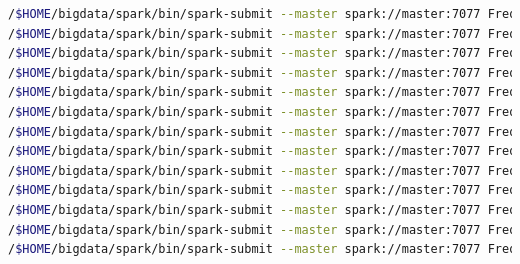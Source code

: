 \begin{lstlisting}[label=sfreqdis,language=sh,frame=single,caption=Script rutas más frecuentes sin estacionalidad en modo distribuido]
/$HOME/bigdata/spark/bin/spark-submit --master spark://master:7077 FrequentRoutes.py mil.parquet 2013-01-01 09:45
/$HOME/bigdata/spark/bin/spark-submit --master spark://master:7077 FrequentRoutes.py quinientos.parquet 2013-01-01 09:45
/$HOME/bigdata/spark/bin/spark-submit --master spark://master:7077 FrequentRoutes.py cinquenta.parquet 2013-01-01 09:45
/$HOME/bigdata/spark/bin/spark-submit --master spark://master:7077 FrequentRoutes.py 1decimo.parquet 2013-01-01 09:45
/$HOME/bigdata/spark/bin/spark-submit --master spark://master:7077 FrequentRoutes.py 2decimo.parquet 2013-01-01 09:45
/$HOME/bigdata/spark/bin/spark-submit --master spark://master:7077 FrequentRoutes.py 3decimo.parquet 2013-01-01 09:45
/$HOME/bigdata/spark/bin/spark-submit --master spark://master:7077 FrequentRoutes.py 4decimo.parquet 2013-01-01 09:45
/$HOME/bigdata/spark/bin/spark-submit --master spark://master:7077 FrequentRoutes.py half.parquet 2013-01-01 09:45
/$HOME/bigdata/spark/bin/spark-submit --master spark://master:7077 FrequentRoutes.py 6decimo.parquet 2013-01-01 09:45
/$HOME/bigdata/spark/bin/spark-submit --master spark://master:7077 FrequentRoutes.py 7decimo.parquet 2013-01-01 09:45
/$HOME/bigdata/spark/bin/spark-submit --master spark://master:7077 FrequentRoutes.py 8decimo.parquet 2013-01-01 09:45
/$HOME/bigdata/spark/bin/spark-submit --master spark://master:7077 FrequentRoutes.py 9decimo.parquet 2013-01-01 09:45
/$HOME/bigdata/spark/bin/spark-submit --master spark://master:7077 FrequentRoutes.py full.parquet 2013-01-01 09:45
\end{lstlisting}

